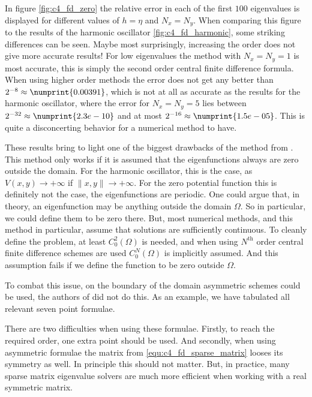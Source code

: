 In figure \ref{fig:c4_fd_zero} the relative error in each of the first $100$ eigenvalues is displayed for different values of $h = \eta$ and $N_x = N_y$. When comparing this figure to the results of the harmonic oscillator \ref{fig:c4_fd_harmonic}, some striking differences can be seen. Maybe most surprisingly, increasing the order does not give more accurate results! For low eigenvalues the method with $N_x=N_y=1$ is most accurate, this is simply the second order central finite difference formula. When using higher order methods the error does not get any better than $2^{-8}\approx \numprint{0.00391}$, which is not at all as accurate as the results for the harmonic oscillator, where the error for $N_x=N_y = 5$ lies between $2^{-32} \approx \numprint{2.3e-10}$ and at most $2^{-16} \approx \numprint{1.5e-05}$. This is quite a disconcerting behavior for a numerical method to have.

These results bring to light one of the biggest drawbacks of the method from \cite{wang_new_2009}. This method only works if it is assumed that the eigenfunctions always are zero outside the domain. For the harmonic oscillator, this is the case, as $V(x, y) \to +\infty$ if $\|x, y\| \to +\infty$. For the zero potential function this is definitely not the case, the eigenfunctions are periodic. One could argue that, in theory, an eigenfunction may be anything outside the domain $\Omega$. So in particular, we could define them to be zero there. But, most numerical methods, and this method in particular, assume that solutions are sufficiently continuous. To cleanly define the problem, at least $C_0^2(\Omega)$ is needed, and when using $N^\text{th}$ order central finite difference schemes are used $C_0^{N}(\Omega)$ is implicitly assumed. And this assumption fails if we define the function to be zero outside $\Omega$.

To combat this issue, on the boundary of the domain asymmetric schemes could be used, the authors of \cite{wang_new_2009} did not do this. As an example, we have tabulated all relevant seven point formulae.
\begin{center}
    
\end{center}
There are two difficulties when using these formulae. Firstly, to reach the required order, one extra point should be used. And secondly, when using asymmetric formulae the matrix from \eqref{equ:c4_fd_sparse_matrix} looses its symmetry as well. In principle this should not matter. But, in practice, many sparse matrix eigenvalue solvers are much more efficient when working with a real symmetric matrix.

